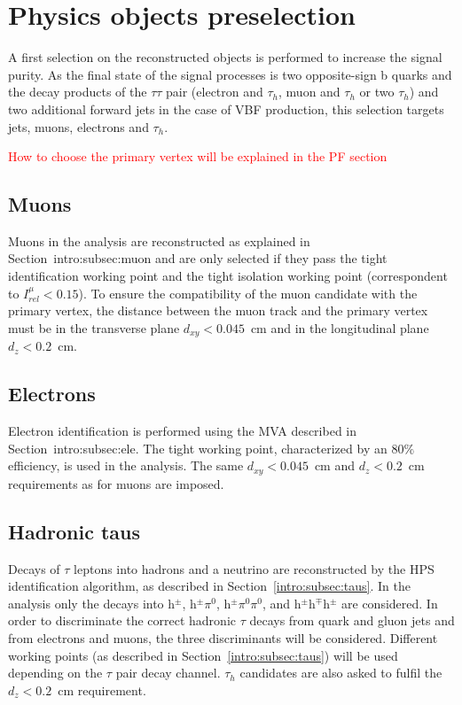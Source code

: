 \documentclass[../main.tex]{subfiles}
\begin{document}
\section{Physics objects preselection}
\label{hh:sec:objects}

A first selection on the reconstructed objects is performed to increase the signal purity. As the final state of the signal processes is two opposite-sign b quarks and the decay products of the $\tau\tau$ pair (electron and $\tau_h$, muon and $\tau_h$ or two $\tau_h$) and two additional forward jets in the case of VBF production, this selection targets jets, muons, electrons and $\tau_h$.


\textcolor{red}{How to choose the primary vertex will be explained in the PF section}

\subsection{Muons}
\label{hh:subsec:muons}

Muons in the analysis are reconstructed as explained in Section~{intro:subsec:muon} and are only selected if they pass the tight identification working point and the tight isolation working point (correspondent to $I^\mu_{rel}<0.15$). To ensure the compatibility of the muon candidate with the primary vertex, the distance between the muon track and the primary vertex must be in the transverse plane $d_{xy}<0.045$~cm  and in the longitudinal plane $d_z<0.2$~cm.

\subsection{Electrons}
\label{hh:subsec:electrons}

Electron identification is performed using the MVA described in Section~{intro:subsec:ele}. The tight working point, characterized by an 80$\%$ efficiency, is used in the analysis. The same $d_{xy}<0.045$~cm and $d_z<0.2$~cm requirements as for muons are imposed.

\subsection{Hadronic taus}
\label{hh:subsec:taus}

Decays of $\tau$ leptons into hadrons and a neutrino are reconstructed by the HPS identification algorithm, as described in Section~\ref{intro:subsec:taus}. In the analysis only the decays into h${}^\pm$,  h${}^\pm \pi^0$, h${}^\pm\pi^0\pi^0$, and h${}^\pm$h${}^\mp$h${}^\pm$ are considered. In order to discriminate the correct hadronic $\tau$ decays from quark and gluon jets and from electrons and muons, the three \deeptau{} discriminants will be considered. Different working points (as described in Section~\ref{intro:subsec:taus}) will be used depending on the $\tau$ pair decay channel. $\tau_h$ candidates are also asked to fulfil the $d_z<0.2$~cm requirement.
\end{document}
